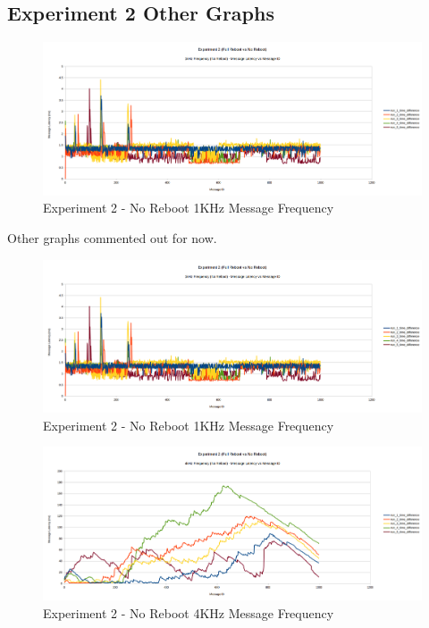 \documentclass{l4proj}
\begin{document}
\begin{appendices}

\chapter{Experiment 2 Other Graphs}
\label{exp2-appendix-results}

\begin{figure}
\centering
\includegraphics[width=\textwidth]{images/no-reboot-1khz.png}
\caption{Experiment 2 - No Reboot 1KHz Message Frequency}
\label{exp2-noreboot-1khz}
\end{figure}
Other graphs commented out for now.
\iffalse
\begin{figure}
\centering
\includegraphics[width=\textwidth]{images/no-reboot-1khz.png}
\caption{Experiment 2 - No Reboot 1KHz Message Frequency}
\label{exp2-fullreboot-1khz}
\end{figure}

\begin{figure}
\centering
\includegraphics[width=\textwidth]{images/no-reboot-4khz.png}
\caption{Experiment 2 - No Reboot 4KHz Message Frequency}
\label{exp2-noreboot-4khz}
\end{figure}


\end{appendices}
\end{document}
